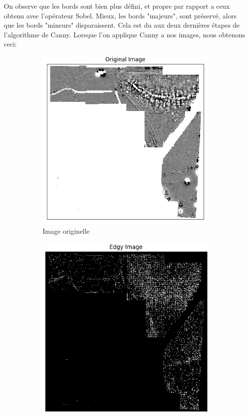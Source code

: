 \documentclass[a4paper, 12pt, titlepage, oneside, french]{article}
\begin{document}
	On observe que les bords sont bien plus défini, et propre par rapport a ceux obtenu avec l'opérateur Sobel. Mieux, les bords "majeurs", sont préservé, alors que les bords "mineurs" disparaissent. Cela est du aux deux dernières étapes de l'algorithme de Canny.
	Lorsque l'on applique Canny a nos images, nous obtenons ceci:
	\begin{figure}[H]
		\centering
		\begin{subfigure}[]{0.4\linewidth}
			\includegraphics[width=\linewidth]{Canny1a.png}
			\caption{Image originelle}
		\end{subfigure}
		\begin{subfigure}[]{0.4\linewidth}
			\includegraphics[width=\linewidth]{Canny1b.png}

\end{subfigure}
\end{figure}
\end{document}

